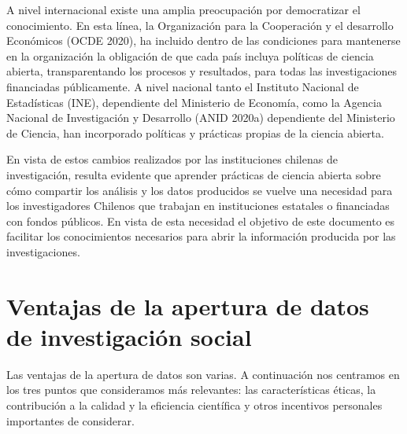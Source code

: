 \documentclass[
  spanish,
  letterpaper,
  DIV=11,
  numbers=noendperiod]{scrreprt}
\begin{document}
A nivel internacional existe una amplia preocupación por democratizar el
conocimiento. En esta línea, la Organización para la Cooperación y el
desarrollo Económicos (OCDE 2020), ha incluido dentro de las condiciones
para mantenerse en la organización la obligación de que cada país
incluya políticas de ciencia abierta, transparentando los procesos y
resultados, para todas las investigaciones financiadas públicamente. A
nivel nacional tanto el Instituto Nacional de Estadísticas (INE),
dependiente del Ministerio de Economía, como la Agencia Nacional de
Investigación y Desarrollo (ANID 2020a) dependiente del Ministerio de
Ciencia, han incorporado políticas y prácticas propias de la ciencia
abierta.

En vista de estos cambios realizados por las instituciones chilenas de
investigación, resulta evidente que aprender prácticas de ciencia
abierta sobre cómo compartir los análisis y los datos producidos se
vuelve una necesidad para los investigadores Chilenos que trabajan en
instituciones estatales o financiadas con fondos públicos. En vista de
esta necesidad el objetivo de este documento es facilitar los
conocimientos necesarios para abrir la información producida por las
investigaciones.

\section{Ventajas de la apertura de datos de investigación
social}\label{ventajas-de-la-apertura-de-datos-de-investigaciuxf3n-social}

Las ventajas de la apertura de datos son varias. A continuación nos
centramos en los tres puntos que consideramos más relevantes: las
características éticas, la contribución a la calidad y la eficiencia
científica y otros incentivos personales importantes de considerar.
\end{document}
